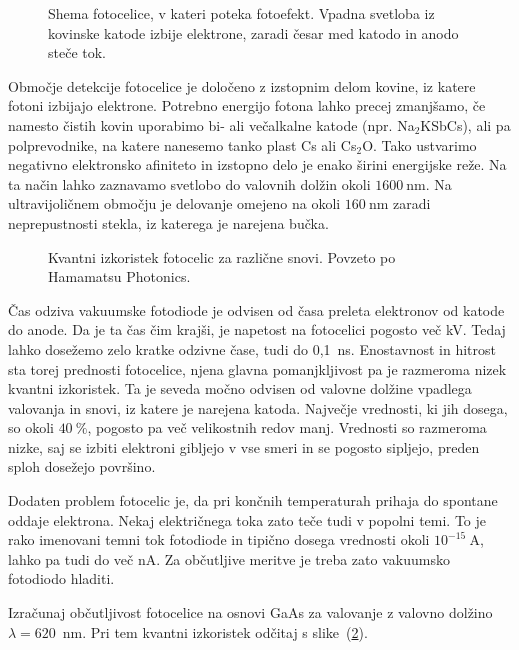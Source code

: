 \begin{figure}[h]
\centering
\def\svgwidth{60truemm} 

\caption{Shema fotocelice, v kateri poteka fotoefekt. 
Vpadna svetloba iz kovinske katode izbije elektrone, zaradi česar med katodo 
in anodo steče tok.}
\label{fig:Fotoefekt}
\end{figure}

Območje detekcije fotocelice je določeno z izstopnim delom kovine, iz katere fotoni izbijajo elektrone. 
Potrebno energijo fotona lahko precej zmanjšamo, če namesto čistih kovin uporabimo bi- ali 
večalkalne katode (npr. Na$_2$KSbCs), ali pa polprevodnike, na katere nanesemo tanko plast 
Cs ali Cs$_2$O. Tako ustvarimo negativno elektronsko afiniteto in izstopno delo je enako širini energijske
reže. Na ta način lahko zaznavamo svetlobo do valovnih dolžin okoli $1600~\si{\nano\metre}$. 
Na ultravijoličnem območju je delovanje
omejeno na okoli $160~\si{\nano\metre}$ zaradi neprepustnosti stekla, iz katerega je narejena bučka.
\begin{figure}[h]
\centering
\def\svgwidth{130truemm} 

\caption{Kvantni izkoristek fotocelic za različne snovi. Povzeto po Hamamatsu Photonics.}
\label{fig:Fotodioda}
\end{figure}

Čas odziva vakuumske fotodiode je odvisen od časa preleta elektronov od katode do anode. 
Da je ta čas čim krajši, je napetost na fotocelici pogosto več kV. Tedaj lahko dosežemo 
zelo kratke odzivne čase, tudi do 0,1~ns. Enostavnost in hitrost sta torej prednosti fotocelice, 
njena glavna pomanjkljivost pa je razmeroma nizek kvantni izkoristek. 
Ta je seveda močno odvisen od valovne dolžine vpadlega valovanja in snovi, iz 
katere je narejena katoda. Največje vrednosti, ki jih dosega, so okoli $40~\%$, 
pogosto pa več velikostnih redov manj. 
Vrednosti so razmeroma nizke, saj se izbiti elektroni gibljejo v vse
smeri in se pogosto sipljejo, preden sploh dosežejo površino. 

Dodaten problem fotocelic je, da pri končnih temperaturah prihaja do spontane oddaje elektrona.
Nekaj električnega toka zato teče tudi v popolni temi. To je rako imenovani temni 
tok fotodiode in tipično dosega vrednosti okoli $10^{-15}~\si{\ampere}$, lahko pa tudi do več nA. 
Za občutljive meritve je treba zato vakuumsko fotodiodo hladiti. 

\vskip1cm
\begin{definition}
Izračunaj občutljivost fotocelice na osnovi GaAs za valovanje z valovno dolžino $\lambda=620$~nm.
Pri tem kvantni izkoristek odčitaj s slike~(\ref{fig:Fotodioda}).
\end{definition}

